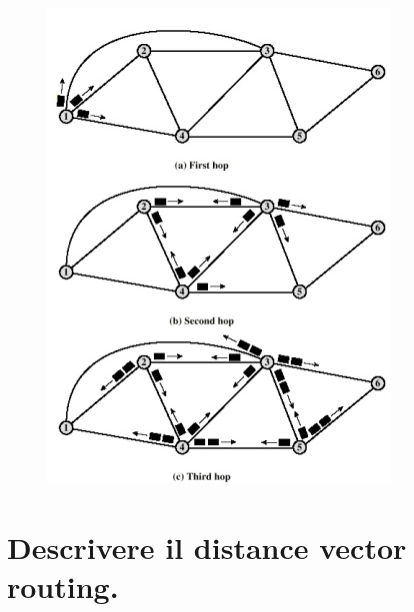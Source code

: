 \begin{figure}[H]
\centering
\includegraphics[scale=0.7]{res/img/32_Flooding.png}
\end{figure}

\section{Descrivere il distance vector routing.}

